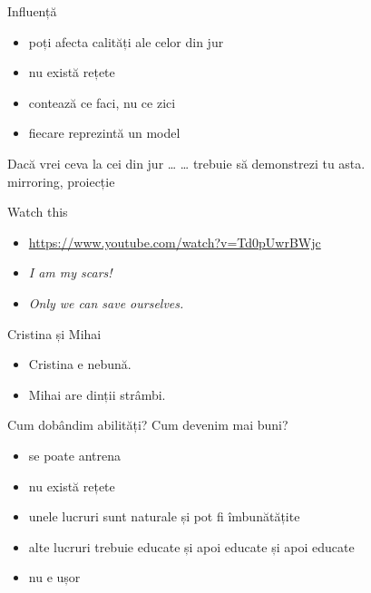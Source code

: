 \documentclass{beamer}
\begin{document}
\begin{frame}{Influență}
  \begin{itemize}
    \pause \item poți afecta calități ale celor din jur
    \pause \item nu există rețete
    \pause \item contează ce faci, nu ce zici
    \pause \item fiecare reprezintă un model
  \end{itemize}
\end{frame}

\begin{frame}{Dacă vrei ceva la cei din jur \ldots}
  \centering
  \pause \Large{\ldots{} trebuie să demonstrezi tu asta.}\\
  \vspace{0.5cm}
  \pause mirroring, proiecție
\end{frame}

\begin{frame}{Watch this}
  \begin{itemize}
    \item \url{https://www.youtube.com/watch?v=Td0pUwrBWjc}
    \pause \item \textit{I am my scars!}
    \pause \item \textit{Only we can save ourselves.}
  \end{itemize}
\end{frame}

\begin{frame}{Cristina și Mihai}
  \begin{itemize}
    \item Cristina e nebună.
    \item Mihai are dinții strâmbi.
  \end{itemize}
\end{frame}

\begin{frame}{Cum dobândim abilități? Cum devenim mai buni?}
  \begin{itemize}
    \pause \item se poate antrena
    \pause \item nu există rețete
    \pause \item unele lucruri sunt naturale și pot fi îmbunătățite
    \pause \item alte lucruri trebuie educate și apoi educate și apoi educate
    \pause \item nu e ușor
  \end{itemize}
\end{frame}
\end{document}
